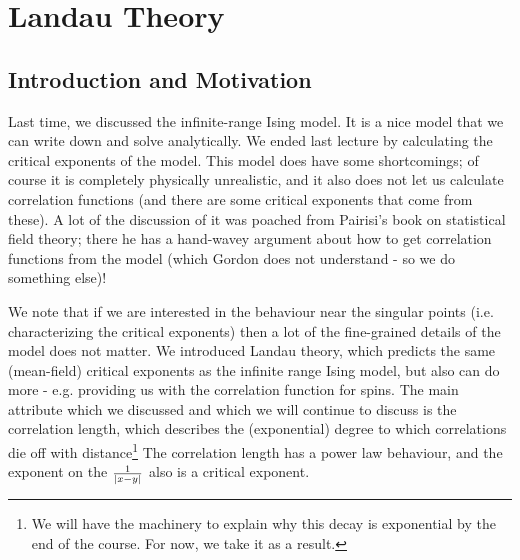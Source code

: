 \section{Landau Theory}


\subsection{Introduction and Motivation}
Last time, we discussed the infinite-range Ising model. It is a nice model that we can write down and solve analytically. We ended last lecture by calculating the critical exponents of the model. This model does have some shortcomings; of course it is completely physically unrealistic, and it also does not let us calculate correlation functions (and there are some critical exponents that come from these). A lot of the discussion of it was poached from Pairisi's book on statistical field theory; there he has a hand-wavey argument about how to get correlation functions from the model (which Gordon does not understand - so we do something else)! 

We note that if we are interested in the behaviour near the singular points (i.e. characterizing the critical exponents) then a lot of the fine-grained details of the model does not matter. We introduced Landau theory, which predicts the same (mean-field) critical exponents as the infinite range Ising model, but also can do more - e.g. providing us with the correlation function for spins. The main attribute which we discussed and which we will continue to discuss is the correlation length, which describes the (exponential) degree to which correlations die off with distance\footnote{We will have the machinery to explain why this decay is exponential by the end of the course. For now, we take it as a result.} The correlation length has a power law behaviour, and the exponent on the $\frac{1}{\lvert x - y \rvert}$ also is a critical exponent.

